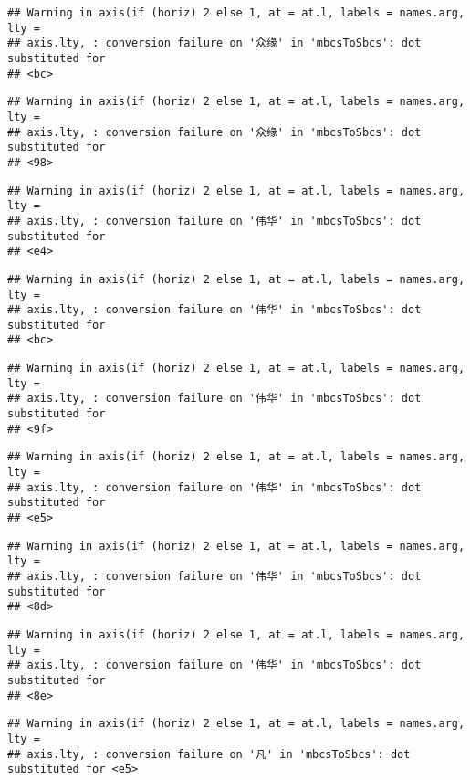 \documentclass[
]{article}
\begin{document}
\begin{verbatim}
## Warning in axis(if (horiz) 2 else 1, at = at.l, labels = names.arg, lty =
## axis.lty, : conversion failure on '众缘' in 'mbcsToSbcs': dot substituted for
## <bc>
\end{verbatim}

\begin{verbatim}
## Warning in axis(if (horiz) 2 else 1, at = at.l, labels = names.arg, lty =
## axis.lty, : conversion failure on '众缘' in 'mbcsToSbcs': dot substituted for
## <98>
\end{verbatim}

\begin{verbatim}
## Warning in axis(if (horiz) 2 else 1, at = at.l, labels = names.arg, lty =
## axis.lty, : conversion failure on '伟华' in 'mbcsToSbcs': dot substituted for
## <e4>
\end{verbatim}

\begin{verbatim}
## Warning in axis(if (horiz) 2 else 1, at = at.l, labels = names.arg, lty =
## axis.lty, : conversion failure on '伟华' in 'mbcsToSbcs': dot substituted for
## <bc>
\end{verbatim}

\begin{verbatim}
## Warning in axis(if (horiz) 2 else 1, at = at.l, labels = names.arg, lty =
## axis.lty, : conversion failure on '伟华' in 'mbcsToSbcs': dot substituted for
## <9f>
\end{verbatim}

\begin{verbatim}
## Warning in axis(if (horiz) 2 else 1, at = at.l, labels = names.arg, lty =
## axis.lty, : conversion failure on '伟华' in 'mbcsToSbcs': dot substituted for
## <e5>
\end{verbatim}

\begin{verbatim}
## Warning in axis(if (horiz) 2 else 1, at = at.l, labels = names.arg, lty =
## axis.lty, : conversion failure on '伟华' in 'mbcsToSbcs': dot substituted for
## <8d>
\end{verbatim}

\begin{verbatim}
## Warning in axis(if (horiz) 2 else 1, at = at.l, labels = names.arg, lty =
## axis.lty, : conversion failure on '伟华' in 'mbcsToSbcs': dot substituted for
## <8e>
\end{verbatim}

\begin{verbatim}
## Warning in axis(if (horiz) 2 else 1, at = at.l, labels = names.arg, lty =
## axis.lty, : conversion failure on '凡' in 'mbcsToSbcs': dot substituted for <e5>
\end{verbatim}
\end{document}
